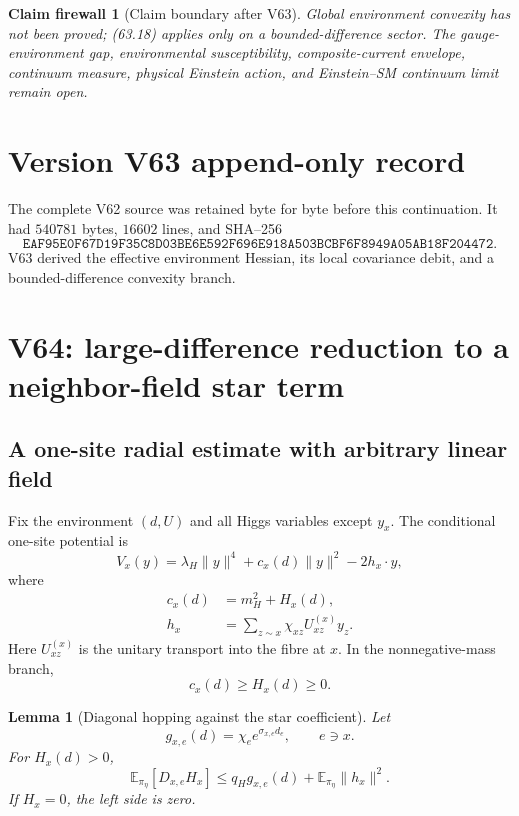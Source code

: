 \documentclass[11pt]{article}
\newtheorem{lemma}[theorem]{Lemma}
\newtheorem{firewall}[theorem]{Claim firewall}
\theoremstyle{remark}
\begin{document}
\begin{firewall}[Claim boundary after V63]
\label{fire:v17v63}
Global environment convexity has not been proved; (63.18) applies only
on a bounded-difference sector.  The gauge-environment gap,
environmental susceptibility, composite-current envelope, continuum
measure, physical Einstein action, and Einstein--SM continuum limit
remain open.
\end{firewall}

\section*{Version V63 append-only record}
The complete V62 source was retained byte for byte before this
continuation.  It had \(540781\) bytes, \(16602\) lines, and SHA--256
\[
 \texttt{EAF95E0F67D19F35C8D03BE6E592F696E918A503BCBF6F8949A05AB18F204472}.
\]
V63 derived the effective environment Hessian, its local covariance
debit, and a bounded-difference convexity branch.


\section{V64: large-difference reduction to a neighbor-field star term}
\label{sec:v17v64}

\subsection{A one-site radial estimate with arbitrary linear field}

Fix the environment \((d,U)\) and all Higgs variables except \(y_x\).
The conditional one-site potential is
\[
 V_x(y)
 =
 \lambda_H\|y\|^4+c_x(d)\|y\|^2-2h_x\cdot y,
                                                               \tag{64.1}
\]
where
\[
\begin{aligned}
 c_x(d)&=m_H^2+H_x(d),\\
 h_x&=\sum_{z\sim x}\chi_{xz}U_{xz}^{(x)}y_z.     \tag{64.2}
\end{aligned}
\]
Here \(U_{xz}^{(x)}\) is the unitary transport into the fibre at \(x\).
In the nonnegative-mass branch,
\[
 c_x(d)\geq H_x(d)\geq0.                          \tag{64.3}
\]

\begin{lemma}[Diagonal hopping against the star coefficient]
\label{lem:v17v64-star}
Let
\[
 g_{x,e}(d)=\chi_e e^{\sigma_{x,e}d_e},
 \qquad e\ni x.                                   \tag{64.4}
\]
For \(H_x(d)>0\),
\[
\boxed{
 \mathbb E_{\pi_\eta}
 [D_{x,e}H_x]
 \leq
 q_Hg_{x,e}(d)+
 \mathbb E_{\pi_\eta}\|h_x\|^2.}                 \tag{64.5}
\]
If \(H_x=0\), the left side is zero.
\end{lemma}
\end{document}
